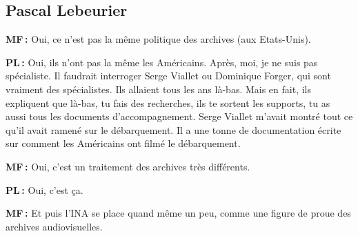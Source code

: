 \subsection*{Pascal Lebeurier  }

\textbf{MF :} Oui, ce n'est pas la même politique des archives (aux Etats-Unis). 

\textbf{PL :} Oui, ils n'ont pas la même les Américains. Après, moi, je ne suis pas spécialiste.  Il faudrait interroger Serge Viallet ou Dominique Forger, qui sont vraiment des spécialistes.  Ils allaient tous les ans là-bas. Mais en fait, ils expliquent que là-bas, tu fais des recherches, ils te sortent les supports, tu as aussi tous les documents d'accompagnement. Serge Viallet m’avait montré tout ce qu'il avait ramené sur le débarquement. Il a une tonne de documentation écrite sur comment les Américains ont filmé le débarquement.  

\textbf{MF :} Oui, c'est un traitement des archives très différents. 

\textbf{PL :} Oui, c'est ça. 

\textbf{MF :}  Et puis l’INA se place quand même un peu, comme une figure de proue des archives audiovisuelles. 

